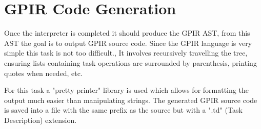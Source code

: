 \section{GPIR Code Generation}

Once the interpreter is completed it should produce the GPIR AST, 
from this AST the goal is to output GPIR source code.
Since the GPIR language is very simple this task is not too difficult.,
It involves recursively travelling the tree, ensuring lists containing task operations
are surrounded by parenthesis, printing quotes when needed, etc.

For this task a "pretty printer" library is used which allows for formatting
the output much easier than manipulating strings. The generated GPIR source code
is saved into a file with the same prefix as the source but with a ".td" (Task Description)
extension.
